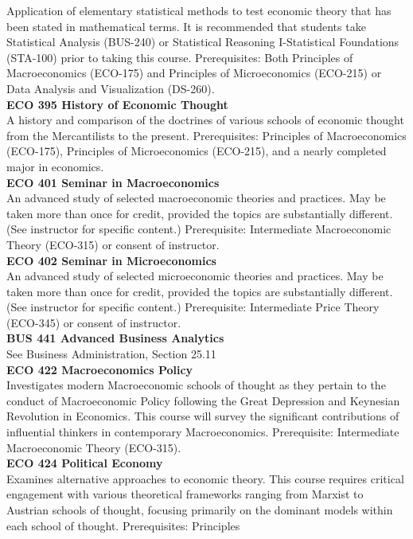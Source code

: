 \documentclass[
  letterpaper,
]{scrbook}
\begin{document}
Application of elementary statistical methods to test economic theory
that has been stated in mathematical terms. It is recommended that
students take Statistical Analysis (BUS-240) or Statistical Reasoning
I-Statistical Foundations (STA-100) prior to taking this course.
Prerequisites: Both Principles of Macroeconomics (ECO-175) and
Principles of Microeconomics (ECO-215) or Data Analysis and
Visualization (DS-260).\\
\textbf{ECO 395 History of Economic Thought}\\
A history and comparison of the doctrines of various schools of economic
thought from the Mercantilists to the present. Prerequisites: Principles
of Macroeconomics (ECO-175), Principles of Microeconomics (ECO-215), and
a nearly completed major in economics.\\
\textbf{ECO 401 Seminar in Macroeconomics}\\
An advanced study of selected macroeconomic theories and practices. May
be taken more than once for credit, provided the topics are
substantially different. (See instructor for specific content.)
Prerequisite: Intermediate Macroeconomic Theory (ECO-315) or consent of
instructor.\\
\textbf{ECO 402 Seminar in Microeconomics}\\
An advanced study of selected microeconomic theories and practices. May
be taken more than once for credit, provided the topics are
substantially different. (See instructor for specific content.)
Prerequisite: Intermediate Price Theory (ECO-345) or consent of
instructor.\\
\textbf{BUS 441 Advanced Business Analytics}\\
See Business Administration, Section 25.11\\
\textbf{ECO 422 Macroeconomics Policy}\\
Investigates modern Macroeconomic schools of thought as they pertain to
the conduct of Macroeconomic Policy following the Great Depression and
Keynesian Revolution in Economics. This course will survey the
significant contributions of influential thinkers in contemporary
Macroeconomics. Prerequisite: Intermediate Macroeconomic Theory
(ECO-315).\\
\textbf{ECO 424 Political Economy}\\
Examines alternative approaches to economic theory. This course requires
critical engagement with various theoretical frameworks ranging from
Marxist to Austrian schools of thought, focusing primarily on the
dominant models within each school of thought. Prerequisites: Principles
\end{document}
